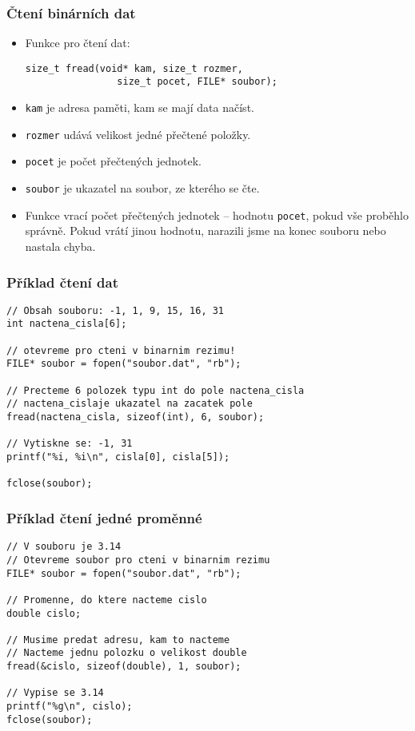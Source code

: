 \documentclass{beamer}
\begin{document}
\begin{frame}[t,fragile]\frametitle{Čtení binárních dat} 
    \begin{itemize}
        \item Funkce pro čtení dat: 
\begin{verbatim} 
size_t fread(void* kam, size_t rozmer, 
                size_t pocet, FILE* soubor);
\end{verbatim}
        \item \texttt{kam} je adresa paměti, kam se mají data načíst.
        \item \texttt{rozmer} udává velikost jedné přečtené položky.
        \item \texttt{pocet} je počet přečtených jednotek.
        \item \texttt{soubor} je ukazatel na soubor, ze kterého se čte.
        \item Funkce vrací počet přečtených jednotek -- hodnotu \texttt{pocet}, pokud vše proběhlo správně. Pokud vrátí jinou hodnotu, narazili jsme na konec souboru nebo nastala chyba.
    \end{itemize}
\end{frame}


\begin{frame}[t,fragile]\frametitle{Příklad čtení dat} 
\begin{verbatim} 
// Obsah souboru: -1, 1, 9, 15, 16, 31
int nactena_cisla[6];

// otevreme pro cteni v binarnim rezimu!
FILE* soubor = fopen("soubor.dat", "rb");

// Precteme 6 polozek typu int do pole nactena_cisla
// nactena_cislaje ukazatel na zacatek pole
fread(nactena_cisla, sizeof(int), 6, soubor);

// Vytiskne se: -1, 31
printf("%i, %i\n", cisla[0], cisla[5]);

fclose(soubor);
\end{verbatim}
\end{frame}


\begin{frame}[t,fragile]\frametitle{Příklad čtení jedné proměnné} 
\begin{verbatim} 
// V souboru je 3.14
// Otevreme soubor pro cteni v binarnim rezimu
FILE* soubor = fopen("soubor.dat", "rb");

// Promenne, do ktere nacteme cislo
double cislo;

// Musime predat adresu, kam to nacteme
// Nacteme jednu polozku o velikost double
fread(&cislo, sizeof(double), 1, soubor);

// Vypise se 3.14
printf("%g\n", cislo);
fclose(soubor);
\end{verbatim}
\end{frame}
\end{document}
